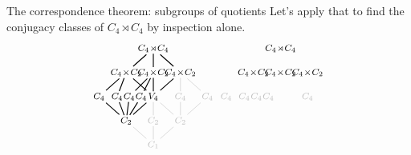\documentclass[8pt, handout]{beamer}
\begin{document}
\begin{frame}{The correspondence theorem: subgroups of quotients}
  Let's apply that to find the conjugacy classes of $C_4\!\rtimes\!C_4$
  by inspection alone.
  \[
  \begin{tikzpicture}[shorten >= -2pt, shorten <= -2pt,xscale=1.2,scale=.7]
    \tikzstyle{every node}=[font=\footnotesize]
    \begin{scope}[shift={(0,0)},scale=.75,yscale=1.6,scale=.9]
      \node (G) at (0,4) {$C_4\!\rtimes\!C_4$};
      \node (C4xC2-1) at (-1.5,3) {$C_4\!\times\!C_2$};
      \node (C4xC2-2) at (0,3) {$C_4\!\times\!C_2$};
      \node (C4xC2-3) at (1.5,3) {$C_4\!\times\!C_2$};
      \node (C4-1) at (-3,2) {$C_4$};
      \node (C4-2) at (-2,2) {$C_4$};
      \node (C4-3) at (-1.33,2) {$C_4$};
      \node (C4-4) at (-.67,2) {$C_4$};
      \node [faded] (C4-5) at (1.5,2) {$C_4$};
      \node [faded] (C4-6) at (3,2) {$C_4$};
      \node (V4) at (0,2) {$V_4$};
      \node (C2-1) at (-1.5,1) {$C_2$};
      \node [faded] (C2-2) at (0,1) {$C_2$};
      \node [faded] (C2-3) at (1.5,1) {$C_2$};
      \node [faded] (1) at (0,0) {$C_1$};
      \draw [thick] (G) to (C4xC2-1);
      \draw [thick] (G) to (C4xC2-2);
      \draw [thick] (G) to (C4xC2-3);
      \draw [thick] (C4xC2-1) to (C4-1);
      \draw [thick] (C4xC2-1) to (C4-2);
      \draw [thick] (C4xC2-1) to (V4); 
      \draw [thick] (C4xC2-2) to (C4-3);
      \draw [thick] (C4xC2-2) to (C4-4);
      \draw [thick] (C4xC2-2) to (V4); 
      \draw [faded] (C4xC2-3) to (C4-5);
      \draw [faded] (C4xC2-3) to (C4-6);
      \draw [thick] (C4xC2-3) to (V4);
      \draw [thick] (C4-1) to (C2-1); \draw [thick] (C4-2) to (C2-1);
      \draw [thick] (C4-3) to (C2-1); \draw [thick] (C4-4) to (C2-1);
      \draw [thick] (V4) to (C2-1); 
      \draw [faded] (V4) to (C2-2); \draw [faded] (V4) to (C2-3);
      \draw [faded] (C4-5) to (C2-3); \draw [faded] (C4-6) to (C2-3);
      \draw [faded] (C2-1) to (1); 
      \draw [faded] (C2-2) to (1); 
      \draw [faded] (C2-3) to (1);
    \end{scope}
    \begin{scope}[shift={(4.75,0)},scale=.75,yscale=1.6,scale=.9]
      \node (G) at (0,4) {$C_4\!\rtimes\!C_4$};
      \node (C4xC2-1) at (-1.5,3) {$C_4\!\times\!C_2$};
      \node (C4xC2-2) at (0,3) {$C_4\!\times\!C_2$};
      \node (C4xC2-3) at (1.5,3) {$C_4\!\times\!C_2$};
      \node [faded] (C4-1) at (-3,2) {$C_4$};
      \node [faded] (C4-2) at (-2,2) {$C_4$};
      \node [faded] (C4-3) at (-1.33,2) {$C_4$};
      \node [faded] (C4-4) at (-.67,2) {$C_4$};
      \node [faded] (C4-5) at (1.5,2) {$C_4$};

\end{scope}
\end{tikzpicture}\]
\end{frame}
\end{document}
